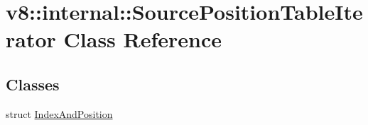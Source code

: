 \hypertarget{classv8_1_1internal_1_1SourcePositionTableIterator}{}\section{v8\+:\+:internal\+:\+:Source\+Position\+Table\+Iterator Class Reference}
\label{classv8_1_1internal_1_1SourcePositionTableIterator}
\subsection*{Classes}
\begin{DoxyCompactItemize}
\item 
struct \mbox{\hyperlink{structv8_1_1internal_1_1SourcePositionTableIterator_1_1IndexAndPosition}{Index\+And\+Position}}
\end{DoxyCompactItemize}

